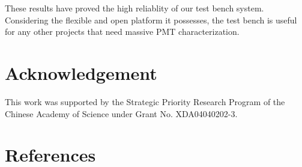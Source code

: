 \documentclass[5p, times]{elsarticle}
\begin{document}
These results have proved the high reliablity of our test bench system.
Considering the flexible and open platform it possesses, the test bench is useful for any other projects that need massive PMT characterization. 

\section*{Acknowledgement}

This work was supported by the Strategic Priority Research Program of the Chinese Academy of Science under Grant No. XDA04040202-3.


\section*{References}

\end{document}
